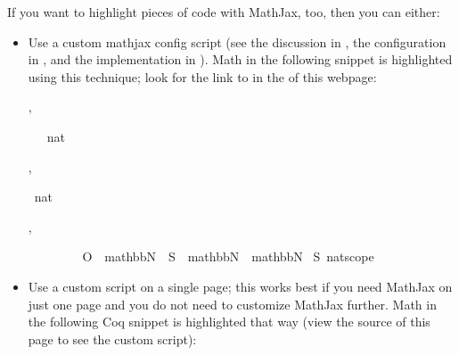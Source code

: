 \documentclass[letterpaper,10pt,english]{sphinxmanual}
\begin{document}
\sphinxAtStartPar
If you want to highlight pieces of code with MathJax, too, then you can either:
\begin{itemize}
\item {} 
\sphinxAtStartPar
Use a custom mathjax config script (see the discussion in , the configuration in , and the implementation in ).  Math in the following snippet is highlighted using this technique; look for the link to  in the  of this webpage:

\begin{alectryon}
  \sep
  \begin{sentence}
    \begin{input}
      ~~~nat\nl
    \end{input}
  \end{sentence}
  \sep
  \begin{sentence}
    \begin{input}
      ~nat
    \end{input}
    \sep
    \begin{output}
      \begin{messages}
        \begin{message}
          ~~~~\nl
          ~~~~O~~mathbbN~~S~~mathbbN~~mathbbN\nl
          \nl
          ~S~\PYGZus{}nat\PYGZus{}scope
        \end{message}
      \end{messages}
    \end{output}
  \end{sentence}
\end{alectryon}

\item {} 
\sphinxAtStartPar
Use a custom script on a single page; this works best if you need MathJax on just one page and you do not need to customize MathJax further.  Math in the following Coq snippet is highlighted that way (view the source of this page to see the custom script):




\end{itemize}
\end{document}
